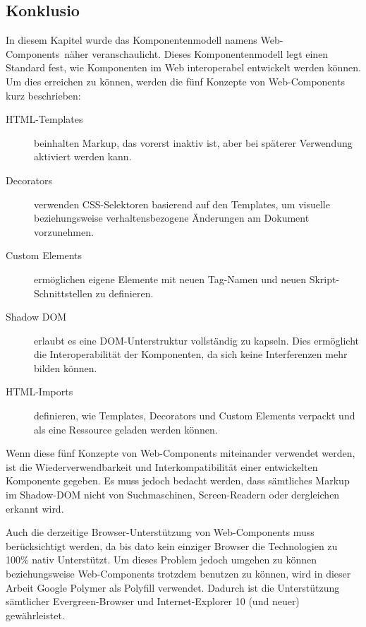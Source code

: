 \subsection{Konklusio}
\label{sec:3_Konklusion}

In diesem Kapitel wurde das Komponentenmodell namens \glqq Web-Components\grqq\ näher veranschaulicht. Dieses Komponentenmodell legt einen Standard fest, wie Komponenten im Web interoperabel entwickelt werden können. Um dies erreichen zu können, werden die fünf Konzepte von Web-Components kurz beschrieben:
\begin{description}
\item[HTML-Templates] beinhalten Markup, das vorerst inaktiv ist, aber bei späterer Verwendung aktiviert werden kann.
\item[Decorators] verwenden CSS-Selektoren basierend auf den Templates, um visuelle beziehungsweise verhaltensbezogene Änderungen am Dokument vorzunehmen.
\item[Custom Elements] ermöglichen eigene Elemente mit neuen Tag-Namen und neuen Skript-Schnittstellen zu definieren.
\item[Shadow DOM] erlaubt es eine DOM-Unterstruktur vollständig zu kapseln. Dies ermöglicht die Interoperabilität der Komponenten, da sich keine Interferenzen mehr bilden können.
\item[HTML-Imports] definieren, wie Templates, Decorators und Custom Elements verpackt und als eine Ressource geladen werden können.
\end{description}

Wenn diese fünf Konzepte von Web-Components miteinander verwendet werden, ist die Wiederverwendbarkeit und Interkompatibilität einer entwickelten Komponente gegeben. Es muss jedoch bedacht werden, dass sämtliches Markup im Shadow-DOM nicht von Suchmaschinen, Screen-Readern oder dergleichen erkannt wird.

Auch die derzeitige Browser-Unterstützung von Web-Components muss berücksichtigt werden, da bis dato kein einziger Browser die Technologien zu 100\% nativ Unterstützt. Um dieses Problem jedoch umgehen zu können beziehungsweise Web-Components trotzdem benutzen zu können, wird in dieser Arbeit Google Polymer als Polyfill verwendet. Dadurch ist die Unterstützung sämtlicher \glqq Evergreen\grqq -Browser und Internet-Explorer 10 (und neuer) gewährleistet.

